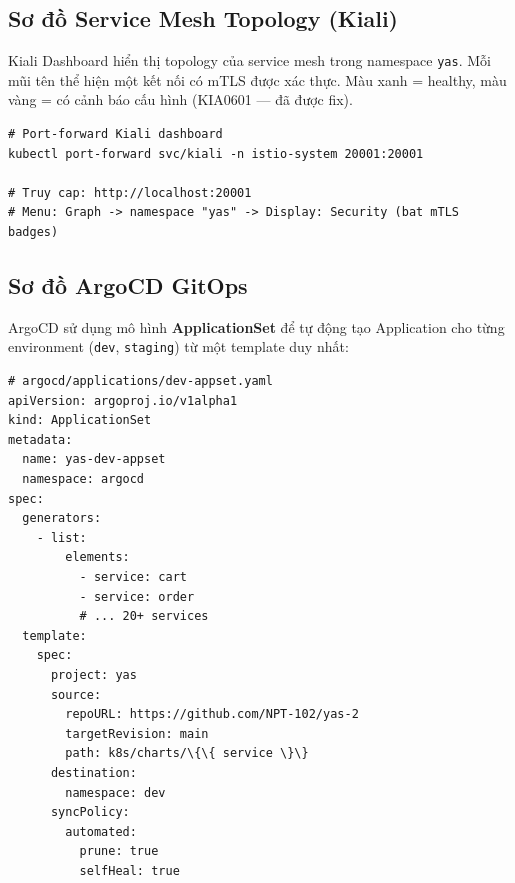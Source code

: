 \subsection{Sơ đồ Service Mesh Topology (Kiali)}

Kiali Dashboard hiển thị topology của service mesh trong namespace \texttt{yas}.
Mỗi mũi tên thể hiện một kết nối có mTLS được xác thực. Màu xanh = healthy,
màu vàng = có cảnh báo cấu hình (KIA0601 — đã được fix).

\begin{infobox}
\begin{lstlisting}[style=bashstyle, belowskip=0pt, aboveskip=0pt]
# Port-forward Kiali dashboard
kubectl port-forward svc/kiali -n istio-system 20001:20001

# Truy cap: http://localhost:20001
# Menu: Graph -> namespace "yas" -> Display: Security (bat mTLS badges)
\end{lstlisting}
\end{infobox}

\subsection{Sơ đồ ArgoCD GitOps}

ArgoCD sử dụng mô hình \textbf{ApplicationSet} để tự động tạo Application
cho từng environment (\texttt{dev}, \texttt{staging}) từ một template duy nhất:

\begin{lstlisting}[style=yamlstyle, caption=Cấu trúc ArgoCD ApplicationSet]
# argocd/applications/dev-appset.yaml
apiVersion: argoproj.io/v1alpha1
kind: ApplicationSet
metadata:
  name: yas-dev-appset
  namespace: argocd
spec:
  generators:
    - list:
        elements:
          - service: cart
          - service: order
          # ... 20+ services
  template:
    spec:
      project: yas
      source:
        repoURL: https://github.com/NPT-102/yas-2
        targetRevision: main
        path: k8s/charts/\{\{ service \}\}
      destination:
        namespace: dev
      syncPolicy:
        automated:
          prune: true
          selfHeal: true
\end{lstlisting}
